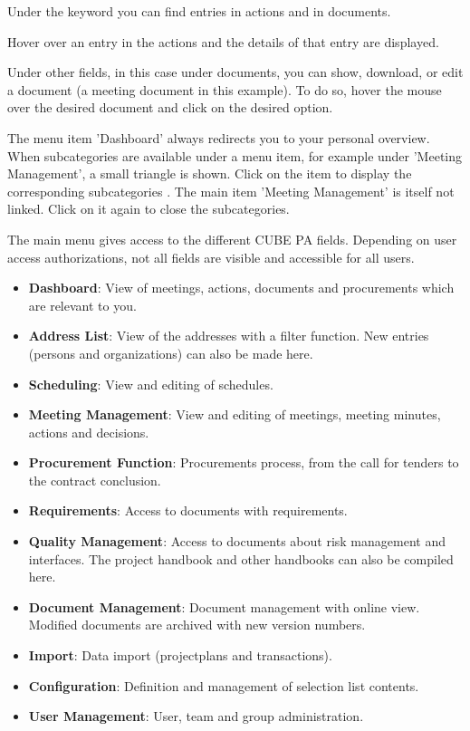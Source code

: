 \begin{compactitem}
	\item Under the keyword you can find entries in actions and in documents.
	\item Hover over an entry in the actions and the details of that entry are displayed.
	\item Under other fields, in this case under documents, you can show, download, or edit a document (a meeting document in this example). To do so, hover the mouse over the desired document and click on the desired option.
\end{compactitem}

\vspace{\baselineskip}

The menu item 'Dashboard'  always redirects you to your personal overview. When subcategories are available under a menu item, for example under 'Meeting Management', a small triangle is shown. Click on the item to display the corresponding subcategories . The main item 'Meeting Management' is itself not linked. Click on it again to close the subcategories.

\vspace{\baselineskip}

The main menu gives access to the different CUBE PA fields. Depending on user access authorizations, not all fields are visible and accessible for all users.

\begin{itemize}
\item
\textbf{Dashboard}: View of meetings, actions, documents and procurements which are relevant to you.
\item
\textbf{Address List}: View of the addresses with a filter function. New entries (persons and organizations) can also be made here.
\item
\textbf{Scheduling}: View and editing of schedules.
\item
\textbf{Meeting Management}: View and editing of meetings, meeting minutes, actions and 
decisions.
\item
\textbf{Procurement Function}: Procurements process, from the call for tenders to the contract conclusion.
\item
\textbf{Requirements}: Access to documents with requirements.
\item
\textbf{Quality Management}: Access to documents about risk management and interfaces. The project handbook and other handbooks can also be compiled here.
\item
\textbf{Document Management}: Document management with online view. Modified documents are archived with new version numbers.
\item
\textbf{Import}: Data import (projectplans and transactions).
\item
\textbf{Configuration}: Definition and management of selection list contents.
\item
\textbf{User Management}: User, team and group administration.
\end{itemize}

